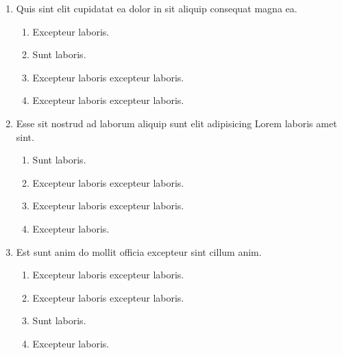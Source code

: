 \documentclass[a4paper,12pt]{article}
\begin{document}
\begin{enumerate}[label=\textbf{\arabic*.}]
\begin{multicols}{2}
\begin{enumerate}
	\end{enumerate}

\end{multicols}
\item Quis sint elit cupidatat ea dolor in sit aliquip consequat magna ea.
\begin{multicols}{2}
	\begin{enumerate}
		\item  Excepteur laboris.
    
		\item  Sunt laboris.
    
		\item  Excepteur laboris excepteur laboris.
    
		\item  Excepteur laboris excepteur laboris.
  
	\end{enumerate}

\end{multicols}
\item Esse sit nostrud ad laborum aliquip sunt elit adipisicing Lorem laboris amet sint.
\begin{multicols}{2}
	\begin{enumerate}
		\item  Sunt laboris.
    
		\item  Excepteur laboris excepteur laboris.
    
		\item  Excepteur laboris excepteur laboris.
  
		\item  Excepteur laboris.
    
	\end{enumerate}

\end{multicols}
\item Est sunt anim do mollit officia excepteur sint cillum anim.
\begin{multicols}{2}
	\begin{enumerate}
		\item  Excepteur laboris excepteur laboris.
  
		\item  Excepteur laboris excepteur laboris.
    
		\item  Sunt laboris.
    
		\item  Excepteur laboris.
    

\end{enumerate}
\end{multicols}
\end{enumerate}
\end{document}
